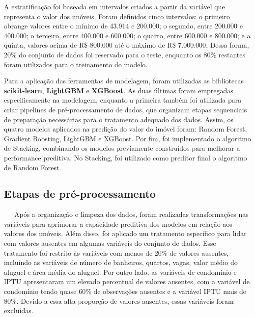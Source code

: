 \documentclass[
  12pt,
  a4paper,
]{scrreprt}
\begin{document}
A estratificação foi baseada em intervalos criados a partir da variável
que representa o valor dos imóveis. Foram definidos cinco intervalos: o
primeiro abrange valores entre o mínimo de 43.914 e 200.000; o segundo,
entre 200.000 e 400.000; o terceiro, entre 400.000 e 600.000; o quarto,
entre 600.000 e 800.000; e a quinta, valores acima de R\$ 800.000 até o
máximo de R\$ 7.000.000. Dessa forma, 20\% do conjunto de dados foi
reservado para o teste, enquanto os 80\% restantes foram utilizados para
o treinamento do modelo.

\vspace{12pt}

Para a aplicação das ferramentas de modelagem, foram utilizadas as
bibliotecas
\href{https://scikit-learn.org/stable/}{\textbf{scikit-learn}},
\href{https://lightgbm.readthedocs.io/en/stable/}{\textbf{LightGBM}} e
\href{https://xgboost.readthedocs.io/en/stable/}{\textbf{XGBoost}}. As
duas últimas foram empregadas especificamente na modelagem, enquanto a
primeira também foi utilizada para criar pipelines de pré-processamento
de dados, que organizam etapas sequenciais de preparação necessárias
para o tratamento adequado dos dados. Assim, os quatro modelos aplicados
na predição do valor do imóvel foram: Random Forest, Gradient Boosting,
LightGBM e XGBoost. Por fim, foi implementado o algoritmo de Stacking,
combinando os modelos previamente construídos para melhorar a
performance preditiva. No Stacking, foi utilizado como preditor final o
algoritmo de Random Forest.

\subsection{Etapas de
pré-processamento}\label{etapas-de-pruxe9-processamento}

~~~Após a organização e limpeza dos dados, foram realizadas
transformações nas variáveis para aprimorar a capacidade preditiva dos
modelos em relação aos valores dos imóveis. Além disso, foi aplicado um
tratamento específico para lidar com valores ausentes em algumas
variáveis do conjunto de dados. Esse tratamento foi restrito às
variáveis com menos de 20\% de valores ausentes, incluindo as variáveis
de número de banheiros, quartos, vagas, valor médio do aluguel e área
média do aluguel. Por outro lado, as variáveis de condomínio e IPTU
apresentaram um elevado percentual de valores ausentes, com a variável
de condomínio tendo quase 60\% de observações ausentes e a variável IPTU
mais de 80\%. Devido a essa alta proporção de valores ausentes, essas
variáveis foram excluídas.
\end{document}
